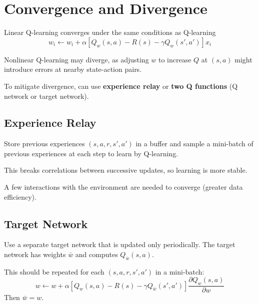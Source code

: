 \documentclass[11pt]{article}
\begin{document}
\section{Convergence and Divergence}
\label{sec:org8fe349d}
Linear Q-learning converges under the same conditions as Q-learning
$$ w_{i} \gets w_{i} + \alpha [Q_{w}(s, a) - R(s) - \gamma Q_{w}(s', a')] x_{i} $$

Nonlinear Q-learning may diverge, as adjusting \(w\) to increase \(Q\) at \((s, a)\) might
introduce errors at nearby state-action pairs.

To mitigate divergence, can use \textbf{experience relay} or \textbf{two Q functions} (Q network or
target network).
\subsection{Experience Relay}
\label{sec:org6a78022}
Store previous experiences \((s, a, r, s', a')\) in a buffer and sample a mini-batch
of previous experiences at each step to learn by Q-learning.

This breaks correlations between successive updates, so learning is more stable.

A few interactions with the environment are needed to converge (greater data
efficiency).
\subsection{Target Network}
\label{sec:orged2c8f0}
Use a separate target network that is updated only periodically.
The target network has weights \(\bar{w}\) and computes \(Q_{\bar{w}}(s, a)\).

This should be repeated for each \((s, a, r, s', a')\) in a mini-batch:
$$ w \gets w + \alpha [Q_{w}(s, a) - R(s) - \gamma Q_{\bar{w}}(s', a')] \frac{\partial Q_{w}(s, a)}{\partial w} $$
Then \(\bar{w} = w\).
\end{document}
